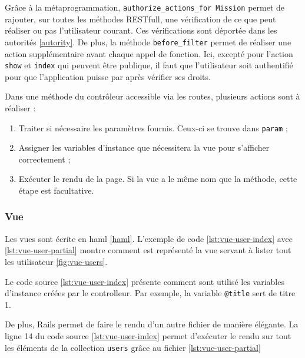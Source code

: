 Grâce à la métaprogrammation, \lstinline[language=Rails]{authorize_actions_for Mission} permet de rajouter, sur toutes les méthodes RESTfull, une vérification de ce que peut réaliser ou pas l'utilisateur courant. Ces vérifications sont déportée dans les autorités \ref{autority}. De plus, la méthode \lstinline[language=Rails]{before_filter} permet de réaliser une action supplémentaire avant chaque appel de fonction. Ici, excepté pour l'action \texttt{show} et \texttt{index} qui peuvent être publique, il faut que l'utilisateur soit authentifié pour que l'application puisse par après vérifier ses droits.

Dans une méthode du contrôleur accessible via les routes, plusieurs actions sont à réaliser :
\begin{enumerate}
  \item Traiter si nécessaire les paramètres fournis. Ceux-ci se trouve dans \lstinline[language=Rails]{param} ;
  \item Assigner les variables d'instance que nécessitera la vue pour s'afficher correctement ;
  \item Exécuter le rendu de la page. Si la vue a le même nom que la méthode, cette étape est facultative.
\end{enumerate}

\subsubsection{Vue}
Les vues sont écrite en haml \ref{haml}. L'exemple de code \ref{lst:vue-user-index} avec \ref{lst:vue-user-partial} montre comment est représenté la vue servant à lister tout les utilisateur \ref{fig:vue-users}.


Le code source \ref{lst:vue-user-index} présente comment sont utilisé les variables d'instance créées par le controlleur. Par exemple, la variable \texttt{@title} sert de titre 1.


De plus, Rails permet de faire le rendu d'un autre fichier de manière élégante. La ligne 14 du code source \ref{lst:vue-user-index} permet d'exécuter le rendu sur tout les éléments de la collection \texttt{users} grâce au fichier \ref{lst:vue-user-partial}

